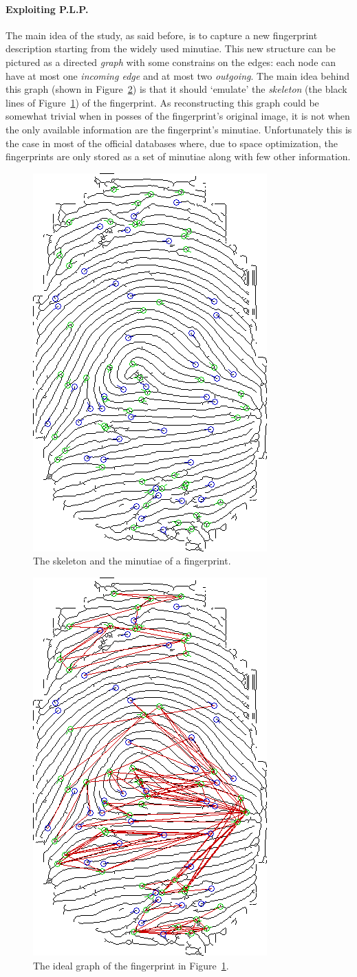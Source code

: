 \documentclass[8pt]{article}
\begin{document}
  \paragraph{Exploiting P.L.P.}
    The main idea of the study, as said before, is to capture a new fingerprint description starting from the widely used minutiae.
    This new structure can be pictured as a directed \textit{graph} with some constrains on the edges: each node can have at most one \textit{incoming edge} and at most two \textit{outgoing}.
    The main idea behind this graph (shown in Figure~\ref{fig:ske_min_graph}) is that it should \textquoteleft emulate' the \textit{skeleton} (the black lines of Figure~\ref{fig:ske_min}) of the fingerprint.
    As reconstructing this graph could be somewhat trivial when in posses of the fingerprint's original image, it is not when the only available information are the fingerprint's minutiae.
    Unfortunately this is the case in most of the official databases where, due to space optimization, the fingerprints are only stored as a set of minutiae along with few other information.
    
   	\begin{figure}
    	\centering
    	\includegraphics[width=0.35\linewidth]{img/ske_min}
    	\caption{The skeleton and the minutiae of a fingerprint.}
    	\label{fig:ske_min}
    \end{figure}
    
    \begin{figure}
    	\centering
    	\includegraphics[width=0.35\linewidth]{img/ske_min_graph}
    	\caption{The ideal graph of the fingerprint in Figure~\ref{fig:ske_min}.}
    	\label{fig:ske_min_graph}
    \end{figure}%
    
\end{document}
